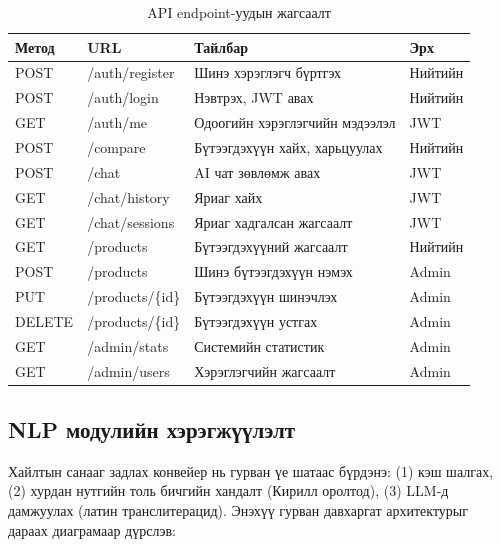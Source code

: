 \documentclass[12pt,a4paper]{report}
\begin{document}
\begin{table}[H]
\centering
\caption{API endpoint-уудын жагсаалт}
\label{tab:api_endpoints}
\begin{tabularx}{\textwidth}{@{}llXl@{}}
\toprule
\textbf{Метод} & \textbf{URL} & \textbf{Тайлбар} & \textbf{Эрх} \\
\midrule
POST & /auth/register & Шинэ хэрэглэгч бүртгэх & Нийтийн \\
POST & /auth/login & Нэвтрэх, JWT авах & Нийтийн \\
GET  & /auth/me & Одоогийн хэрэглэгчийн мэдээлэл & JWT \\
POST & /compare & Бүтээгдэхүүн хайх, харьцуулах & Нийтийн \\
POST & /chat & AI чат зөвлөмж авах & JWT \\
GET  & /chat/history & Яриаг хайх & JWT \\
GET  & /chat/sessions & Яриаг хадгалсан жагсаалт & JWT \\
GET  & /products & Бүтээгдэхүүний жагсаалт & Нийтийн \\
POST & /products & Шинэ бүтээгдэхүүн нэмэх & Admin \\
PUT  & /products/\{id\} & Бүтээгдэхүүн шинэчлэх & Admin \\
DELETE & /products/\{id\} & Бүтээгдэхүүн устгах & Admin \\
GET  & /admin/stats & Системийн статистик & Admin \\
GET  & /admin/users & Хэрэглэгчийн жагсаалт & Admin \\
\bottomrule
\end{tabularx}
\end{table}

\subsection{NLP модулийн хэрэгжүүлэлт}

Хайлтын санааг задлах конвейер нь гурван үе шатаас бүрдэнэ: (1) кэш шалгах, (2) хурдан нутгийн толь бичгийн хандалт (Кирилл оролтод), (3) LLM-д дамжуулах (латин транслитерацид). Энэхүү гурван давхаргат архитектурыг дараах диаграмаар дүрслэв:
\end{document}

